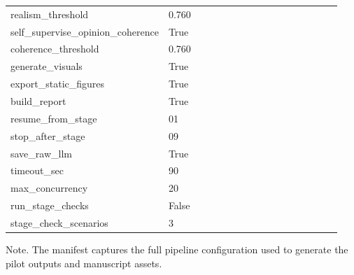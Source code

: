 \begin{table}[htbp]
{\begin{tabular}{p{0.24\linewidth}p{0.70\linewidth}}
realism\_threshold & 0.760 \\
self\_supervise\_opinion\_coherence & True \\
coherence\_threshold & 0.760 \\
generate\_visuals & True \\
export\_static\_figures & True \\
build\_report & True \\
resume\_from\_stage & 01 \\
stop\_after\_stage & 09 \\
save\_raw\_llm & True \\
timeout\_sec & 90 \\
max\_concurrency & 20 \\
run\_stage\_checks & False \\
stage\_check\_scenarios & 3 \\
\bottomrule
\end{tabular}
}
\par\smallskip
{\normalsize Note. The manifest captures the full pipeline configuration used to generate the pilot outputs and manuscript assets.}
\end{table}